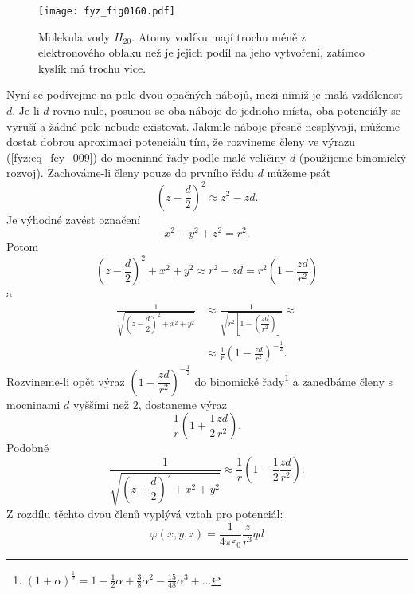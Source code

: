   \begin{figure}[ht!] %
    \centering
    \texttt{[image: fyz\_fig0160.pdf]}
    \caption{Molekula vody \(H_20\). Atomy vodíku mají trochu méně z elektronového oblaku než 
      je jejich podíl na jeho vytvoření, zatímco kyslík má trochu více.}
    \label{fyz:fig0160}
  \end{figure} 
  Nyní se podívejme na pole dvou opačných nábojů, mezi nimiž je malá vzdálenost \(d\). Je-li \(d\)
  rovno nule, posunou se oba náboje do jednoho místa, oba potenciály se vyruší a žádné pole nebude
  existovat. Jakmile náboje přesně nesplývají, můžeme dostat dobrou aproximaci potenciálu tím, že
  rozvineme členy ve výrazu (\ref{fyz:eq_fey_009}) do mocninné řady podle malé veličiny \(d\)
  (použijeme binomický rozvoj). Zachováme-li členy pouze do prvního řádu \(d\) můžeme psát  
  \begin{equation}\label{fyz:eq_fey_010}
    \left(z-\dfrac{d}{2}\right)^2\approx z^2 - zd.
  \end{equation}
  Je výhodné zavést označení
  \begin{equation}\label{fyz:eq_fey_011}
    x^2 + y^2 + z^2 = r^2.
  \end{equation}
  Potom
  \begin{equation}\label{fyz:eq_fey_012}
    \left(z-\dfrac{d}{2}\right)^2 + x^2 + y^2 \approx r^2 - zd 
      = r^2\left(1 - \dfrac{zd}{r^2}\right) 
  \end{equation}
  a 
  \begin{align}\label{fyz:eq_fey_013}
     \frac{1}{\sqrt{\left(z-\dfrac{d}{2}\right)^2 + x^2 + y^2}}       
    &\approx 
     \frac{1}{\sqrt{r^2\left[1-\left(\dfrac{zd}{r^2}\right)\right]}}   \approx   \nonumber \\
    &\approx 
     \frac{1}{r}\left(1-\frac{zd}{r^2}\right)^{-\frac{1}{2}}. 
  \end{align}
  Rozvineme-li opět výraz \(\left(1-\dfrac{zd}{r^2}\right)^{-\frac{1}{2}}\) do binomické 
  řady\footnote{\((1+\alpha)^{\frac{1}{2}} = 1 - \frac{1}{2}\alpha + \frac{3}{8}\alpha^2 - 
  \frac{15}{48}\alpha^3 + \ldots\)} a zanedbáme členy s mocninami \(d\) vyššími než \(2\), 
  dostaneme výraz
  \begin{equation}\label{fyz:eq_fey_014}
    \frac{1}{r}\left(1+\frac{1}{2}\frac{zd}{r^2}\right). 
  \end{equation}
  Podobně
  \begin{equation}\label{fyz:eq_fey_015}
    \frac{1}{\sqrt{\left(z+\dfrac{d}{2}\right)^2 + x^2 + y^2}}      \approx 
    \frac{1}{r}\left(1-\frac{1}{2}\frac{zd}{r^2}\right). 
  \end{equation}
  Z rozdílu těchto dvou členů vyplývá vztah pro potenciál:
  \begin{equation}\label{fyz:eq_fey_016}
    \varphi(x,y,z) = \dfrac{1}{4\pi\varepsilon_0}\dfrac{z}{r^3}qd
  \end{equation}
  

